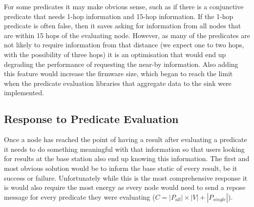 For some predicates it may make obvious sense, such as if there is a conjunctive predicate that needs 1-hop information and 15-hop information. If the 1-hop predicate is often false, then it saves asking for information from all nodes that are within 15 hops of the evaluating node. However, as many of the predicates are not likely to require information from that distance (we expect one to two hops, with the possibility of three hops) it is an optimisation that would end up degrading the performance of requesting the near-by information. Also adding this feature would increase the firmware size, which began to reach the limit when the predicate evaluation libraries that aggregate data to the sink were implemented.

\subsection{Response to Predicate Evaluation}

Once a node has reached the point of having a result after evaluating a predicate it needs to do something meaningful with that information so that users looking for results at the base station also end up knowing this information. The first and most obvious solution would be to inform the base static of every result, be it success or failure. Unfortunately while this is the most comprehensive response it is would also require the most energy as every node would need to send a repose message for every predicate they were evaluating ($C = |P_{all}| \times |V| + |P_{single}|$).

